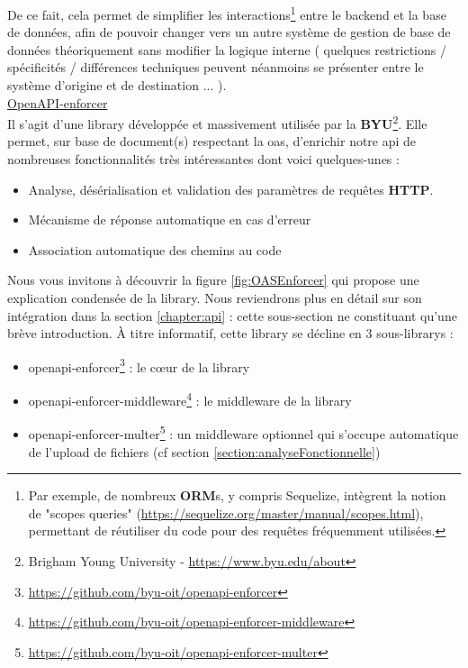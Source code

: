 De ce fait, cela permet de simplifier les interactions\footnote{
    Par exemple, de nombreux \textbf{ORM}s, y compris Sequelize, intègrent la notion de "scopes queries" (\url{https://sequelize.org/master/manual/scopes.html}), permettant de réutiliser du code pour des requêtes fréquemment utilisées.
} entre le \gls{backend} et la base de données, afin de pouvoir changer vers un autre système de gestion de base de données théoriquement sans modifier la logique interne (
quelques restrictions / spécificités / différences techniques peuvent néanmoins se présenter entre le système d'origine et de destination ...
). \\

\noindent\underline{OpenAPI-enforcer}\\

Il s'agit d'une \gls{library} développée et massivement utilisée par la \textbf{BYU}\footnote{
    Brigham Young University - \url{https://www.byu.edu/about}
}. 
Elle permet, sur base de document(s) respectant la \Gls{oas}, d'enrichir notre \Gls{api} de nombreuses fonctionnalités très intéressantes dont voici quelques-unes :

\begin{itemize}[nosep,noitemsep,topsep=0pt,partopsep=0pt,after=\vspace*{2pt}]
    \item Analyse, désérialisation et validation des paramètres de requêtes \textbf{HTTP}.
    \item Mécanisme de réponse automatique en cas d'erreur
    \item Association automatique des chemins au code
\end{itemize}

Nous vous invitons à découvrir la figure \ref{fig:OASEnforcer} qui propose une explication condensée de la \gls{library}.
Nous reviendrons plus en détail sur son intégration dans la section \ref{chapter:api} : cette sous-section ne constituant qu'une brève introduction.
À titre informatif, cette \gls{library} se décline en 3 sous-\glspl{library} :

\begin{itemize}[nosep,noitemsep,topsep=0pt,partopsep=0pt,after=\vspace*{2pt}]
    \item openapi-enforcer\footnote{
        \url{https://github.com/byu-oit/openapi-enforcer}
    } : le cœur de la \gls{library}
    \item openapi-enforcer-middleware\footnote{
        \url{https://github.com/byu-oit/openapi-enforcer-middleware}
    } : le \gls{middleware} de la \gls{library}
    \item openapi-enforcer-multer\footnote{
        \url{https://github.com/byu-oit/openapi-enforcer-multer}
    } : un \gls{middleware} optionnel qui s'occupe automatique de l'upload de fichiers (cf section \ref{section:analyseFonctionnelle})
\end{itemize}

